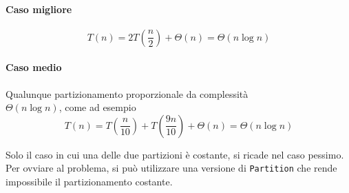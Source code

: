 \paragraph{Caso migliore}
$$T(n) = 2 T\left( \frac{n}{2} \right) + \Theta (n) = \Theta(n \log n)$$

\paragraph{Caso medio} Qualunque partizionamento proporzionale da complessità \\ 
$\Theta (n \log n)$, come ad esempio
$$T(n) = T \left( \frac{n}{10} \right) + T \left( \frac{9n}{10} \right) + \Theta (n) = \Theta (n \log n)$$

Solo il caso in cui una delle due partizioni è costante, si ricade nel caso pessimo. Per ovviare al
problema, si può utilizzare una versione di \texttt{Partition} che rende impossibile il partizionamento costante.

